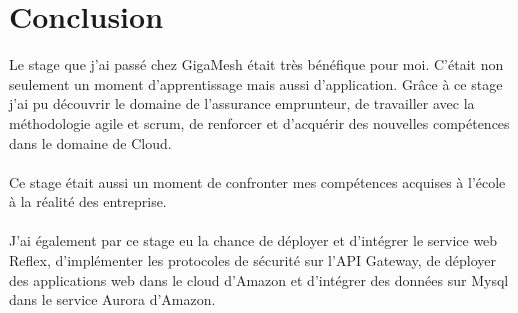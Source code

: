 \documentclass[
11pt, %
french, %
singlespacing, %
headsepline, %
]{MastersDoctoralThesis} %
\begin{document}









\mainmatter %

\pagestyle{thesis} %



 

 
% 
\chapter*{Conclusion}
Le stage que j'ai passé chez GigaMesh était très bénéfique pour moi. C'était non seulement un moment d'apprentissage mais aussi d'application. 
Grâce à ce stage j'ai pu découvrir le domaine de l'assurance emprunteur, de travailler avec la méthodologie agile et scrum, de renforcer et d'acquérir des nouvelles compétences dans le domaine de Cloud.\\ \\Ce stage était aussi un moment de confronter mes compétences acquises à l'école à la réalité des entreprise.\\ \\J'ai également par ce stage eu la chance de déployer et d'intégrer le service web Reflex, d'implémenter les protocoles de sécurité sur l'API Gateway, de déployer des applications web dans le cloud d'Amazon et d'intégrer des données sur Mysql dans le service Aurora d'Amazon. 
\end{document}
